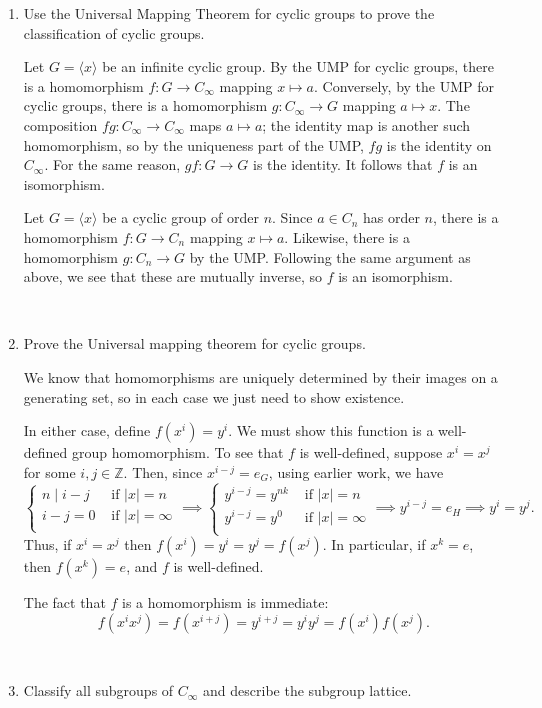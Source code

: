 \documentclass[12pt]{amsart}
\newcommand{\Bold}[1]{\contour{black}{#1}}
\newcommand{\Z}{\mathbb{Z}}
\newcommand{\solution}[1]{\ifthenelse {\equal{\displaysol}{1}} {\begin{framed}{\color{meretale}\noindent #1}\end{framed}} { \ }}
\newcommand\itemA{\stepcounter{enumi}\item[{\Bold{(\theenumi)}}]}
\newcommand\itemB{\stepcounter{enumi}\item[(\theenumi)]}
\begin{document}
\begin{enumerate}
\itemA Use the Universal Mapping Theorem for cyclic groups to prove the classification of cyclic groups.

\solution{Let $G=\langle x \rangle$ be an infinite cyclic group. By the UMP for cyclic groups, there is a homomorphism $f: G\to C_\infty$ mapping $x\mapsto a$. Conversely, by the UMP for cyclic groups, there is a homomorphism $g:C_\infty \to G$ mapping $a\mapsto x$. The composition $fg:C_\infty \to C_\infty$ maps $a\mapsto a$; the identity map is another such homomorphism, so by the uniqueness part of the UMP, $fg$ is the identity on $C_\infty$. For the same reason, $gf: G\to G$ is the identity. It follows that $f$ is an isomorphism.

Let $G=\langle x \rangle$ be a cyclic group of order $n$. Since $a\in C_n$ has order $n$, there is a homomorphism $f:G\to C_n$ mapping $x\mapsto a$. Likewise, there is a homomorphism $g:C_n \to G$ by the UMP. Following the same argument as above, we see that these are mutually inverse, so $f$ is an isomorphism.}

\itemA Prove the Universal mapping theorem for cyclic groups.

\solution{
We know that homomorphisms are uniquely determined by their images on a generating set, so in each case we just need to show existence.

In either case, define $f(x^i) = y^i$.  We must show this function is a well-defined group homomorphism.
To see that $f$ is well-defined, suppose $x^i=x^j$ for some $i,j\in \Z$. Then, since $x^{i-j}=e_G$, using earlier work, we have
$$\begin{cases}
n\mid i-j & \text{ if } |x|=n\\
i-j=0 & \text{ if } |x|=\infty\\
\end{cases}
\implies
\begin{cases}
y^ {i-j}=y^{nk} & \text{ if } |x|=n\\
y^{i-j}=y^0 & \text{ if } |x|=\infty\\
\end{cases}
\implies y^ {i-j}=e_H
\implies y^ i=y^j.
$$
Thus, if $x^i=x^j$ then $f(x^i)=y^i=y^j=f(x^j)$. In particular, if $x^k = e$, then $f(x^k) = e$, and $f$ is well-defined.

The fact that $f$ is a homomorphism is immediate: 
$$f(x^ix^j)=f(x^{i+j})=y^{i+j}=y^iy^j=f(x^i)f(x^j).$$


}

\itemB Classify all subgroups of $C_\infty$ and describe the subgroup lattice.
\end{enumerate}
\end{document}
